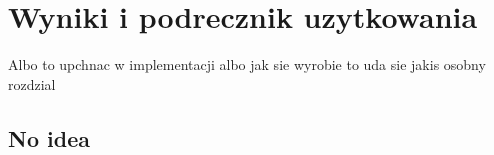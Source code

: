 \chapter{Wyniki i podrecznik uzytkowania}
\label{cha:wyniki}
Albo to upchnac w implementacji albo jak sie wyrobie to uda sie jakis osobny rozdzial
\section{No idea}


